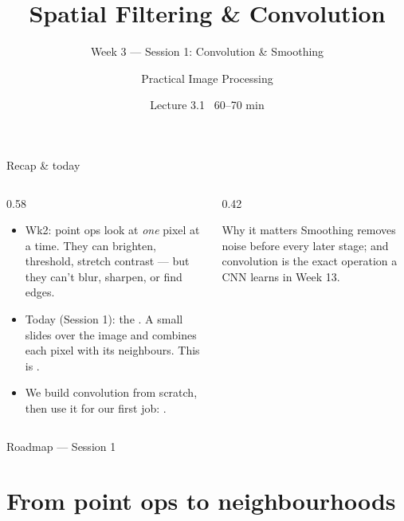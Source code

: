 \documentclass[10pt,aspectratio=169]{beamer}
\title{Spatial Filtering \& Convolution}
\subtitle{Week 3 — Session 1: Convolution \& Smoothing}
\author{Practical Image Processing}
\date{Lecture 3.1 \textbullet\ 60--70 min}
\begin{document}
\maketitle

\begin{frame}{Recap \& today}
  \begin{columns}[T]
    \begin{column}{0.58\textwidth}
      \begin{itemize}
        \item Wk2: point ops look at \emph{one} pixel at a time. They can brighten, threshold,
              stretch contrast — but they can't blur, sharpen, or find edges.
        \item \alert{Today (Session 1):} the . A small  slides
              over the image and combines each pixel with its neighbours. This is .
        \item We build convolution from scratch, then use it for our first job: .
      \end{itemize}
    \end{column}
    \begin{column}{0.42\textwidth}
      \begin{alertblock}{Why it matters}
        Smoothing removes noise before every later stage; and convolution is the exact
        operation a CNN learns in Week 13.
      \end{alertblock}
    \end{column}
  \end{columns}
\end{frame}

\begin{frame}{Roadmap — Session 1}\tableofcontents\end{frame}

\section{From point ops to neighbourhoods}
\end{document}
